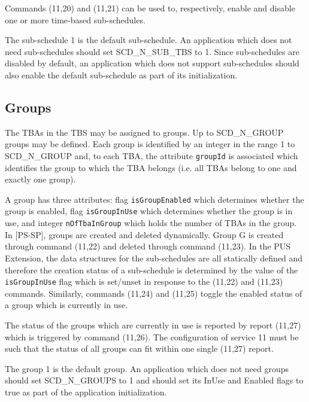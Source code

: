 \documentclass{pnp_article}
\begin{document}
Commands (11,20) and (11,21) can be used to, respectively, enable and disable one or more time-based sub-schedules.

The sub-schedule 1 is the default sub-schedule. An application which does not need sub-schedules should set SCD\_N\_SUB\_TBS to 1. Since sub-schedules are disabled by default, an application which does not support sub-schedules should also enable the default sub-schedule as part of its initialization.

\subsection{Groups}
The TBAs in the TBS may be assigned to groups. Up to SCD\_N\_GROUP groups may be defined. Each group is identified by an integer in the range 1 to SCD\_N\_GROUP and, to each TBA, the attribute \texttt{groupId} is associated which identifies the group to which the TBA belongs (i.e. all TBAs belong to one and exactly one group). 

A group has three attributes: flag \texttt{isGroupEnabled} which determines whether the group is enabled, flag \texttt{isGroupInUse} which determines whether the group is in use, and integer \texttt{nOfTbaInGroup} which holds the number of TBAs in the group. In [PS-SP], groups are created and deleted dynamically. Group G is created through command (11,22) and deleted through command (11,23). In the PUS Extension, the data structures for the sub-schedules are all statically defined and therefore the creation status of a sub-schedule is determined by the value of the \texttt{isGroupInUse} flag which is set/unset in response to the (11,22) and (11,23) commands. Similarly, commands (11,24) and (11,25) toggle the enabled status of a group which is currently in use.

The status of the groups which are currently in use is reported by report (11,27) which is triggered by command (11,26). The configuration of service 11 must be such that the status of all groups can fit within one single (11,27) report.

The group 1 is the default group. An application which does not need groups should set SCD\_N\_GROUPS to 1 and should set its InUse and Enabled flags to true as part of the application initialization.
\end{document}
